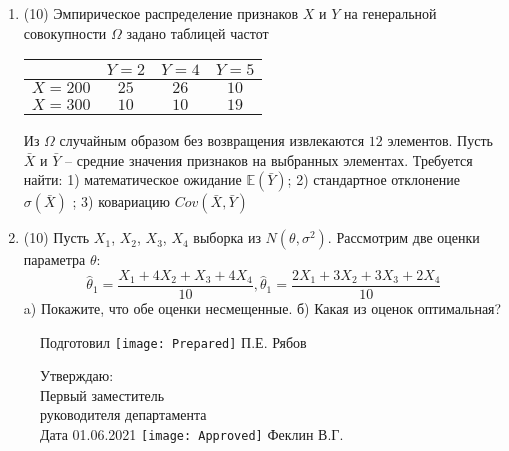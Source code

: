 \documentclass[a4paper,10pt]{article}
\begin{document}
\begin{enumerate}
\item


(10) Эмпирическое распределение признаков $X$ и $Y$ на генеральной совокупности $\Omega$ задано таблицей частот  
 
\begin{tabular}{ | c | c | c | c | }
\hline
 & $Y = 2$ & $Y = 4$ & $Y = 5$  \\ \hline
$X = 200$ & $25$ & $26$ & $10$\\ \hline
$X = 300$ & $10$ & $10$ & $19$\\
\hline
\end{tabular}

Из $\Omega$ случайным образом без возвращения извлекаются $12$ элементов. 
Пусть $\bar X$ и $\bar Y$ – средние значения признаков на выбранных элементах. 
Требуется найти: 1) математическое ожидание $\mathbb{E}(\bar Y)$; 2) стандартное отклонение $\sigma(\bar X)$ ; 
3) ковариацию $Cov(\bar X, \bar Y)$


\item


(10) Пусть $X _{1}$, $X _{2}$, $X _{3}$, $X _{4}$ выборка из $N(\theta, \sigma ^{2})$. Рассмотрим две оценки параметра $\theta$:
\[\hat \theta _{1} = \frac{X _{1} + 4X _{2} + X _{3} + 4X _{4}}{10}, \hat \theta _{1} = \frac{2X _{1} + 3X _{2} + 3X _{3} + 2X _{4}}{10}\]
a) Покажите, что обе оценки несмещенные.
б) Какая из оценок оптимальная?


\end{enumerate}

\begin{figure}[H]
	Подготовил
	\hfill
	\texttt{[image: Prepared]}
	П.Е. Рябов
\end{figure}


\begin{figure}[H]
	Утверждаю:\\
	Первый заместитель\\
	руководителя департамента\\
	Дата 01.06.2021
	\hfill
	\texttt{[image: Approved]}
	Феклин В.Г.
\end{figure}
\end{document}
